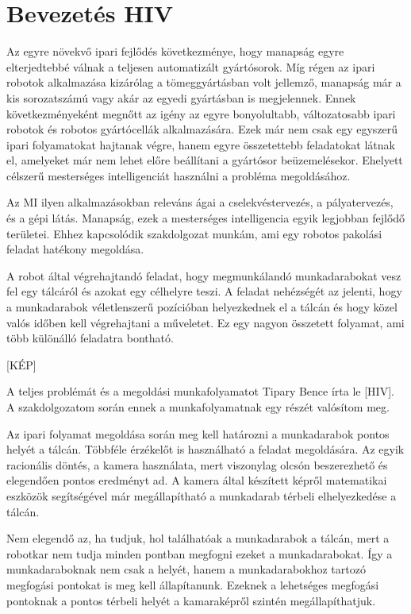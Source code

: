 \chapter{Bevezetés HIV}

Az egyre növekvő ipari fejlődés következménye, hogy manapság egyre elterjedtebbé válnak a teljesen automatizált gyártósorok. Míg régen az ipari robotok alkalmazása kizárólag a tömeggyártásban volt jellemző, manapság már a kis sorozatszámú vagy akár az egyedi gyártásban is megjelennek. Ennek következményeként megnőtt az igény az egyre bonyolultabb, változatosabb ipari robotok és robotos gyártócellák alkalmazására. Ezek már nem csak egy egyszerű ipari folyamatokat hajtanak végre, hanem egyre összetettebb feladatokat látnak el, amelyeket már nem lehet előre beállítani a gyártósor beüzemelésekor. Ehelyett célszerű mesterséges intelligenciát használni a probléma megoldásához.

Az MI ilyen alkalmazásokban releváns ágai a cselekvéstervezés, a pályatervezés, és a gépi látás. Manapság, ezek a mesterséges intelligencia egyik legjobban fejlődő területei. Ehhez kapcsolódik szakdolgozat munkám, ami egy robotos pakolási feladat hatékony megoldása.

A robot által végrehajtandó feladat, hogy megmunkálandó munkadarabokat vesz fel egy tálcáról és azokat egy célhelyre teszi. A feladat nehézségét az jelenti, hogy a munkadarabok véletlenszerű pozícióban helyezkednek el a tálcán és hogy közel valós időben kell végrehajtani a műveletet. Ez egy nagyon összetett folyamat, ami több különálló feladatra bontható.

[KÉP]

A teljes problémát és a megoldási munkafolyamatot Tipary Bence írta le [HIV]. A szakdolgozatom során ennek a munkafolyamatnak egy részét valósítom meg.

Az ipari folyamat megoldása során meg kell határozni a munkadarabok pontos helyét a tálcán. Többféle érzékelőt is használható a feladat megoldására. Az egyik racionális döntés, a kamera használata, mert viszonylag olcsón beszerezhető és elegendően pontos eredményt ad. A kamera által készített képről matematikai eszközök segítségével már megállapítható a munkadarab térbeli elhelyezkedése a tálcán.

Nem elegendő az, ha tudjuk, hol találhatóak a munkadarabok a tálcán, mert a robotkar nem tudja minden pontban megfogni ezeket a munkadarabokat. Így a munkadaraboknak nem csak a helyét, hanem a munkadarabokhoz tartozó megfogási pontokat is meg kell állapítanunk. Ezeknek a lehetséges megfogási pontoknak a pontos térbeli helyét a kamaraképről szintén megállapíthatjuk. 

